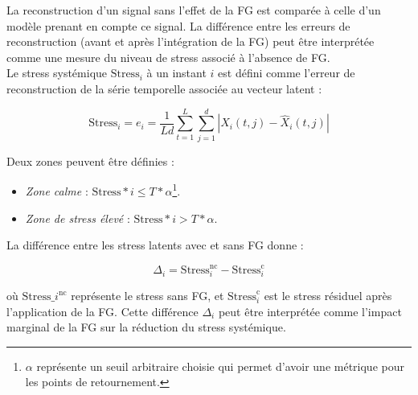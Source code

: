 La reconstruction d’un signal sans l'effet de la FG est comparée à celle d'un modèle prenant en compte ce signal. La différence entre les erreurs de reconstruction (avant et après l’intégration de la FG) peut être interprétée comme une mesure du niveau de stress associé à l'absence de FG.\\

Le stress systémique $\text{Stress}_i$ à un instant $i$ est défini comme l’erreur de reconstruction de la série temporelle associée au vecteur latent :

\begin{equation}
\text{Stress}_i = e_i = \frac{1}{Ld} \sum_{t=1}^L \sum_{j=1}^d |X_i(t,j) - \widehat{X}_i(t,j)|
\end{equation}

Deux zones peuvent être définies :

\begin{itemize}
    \item \textit{Zone calme} : $\text{Stress}*i \leq T*{\alpha}$\footnote{$\alpha$ représente un seuil arbitraire choisie qui permet d'avoir une métrique pour les points de retournement.}.
    \item \textit{Zone de stress élevé} : $\text{Stress}*i > T*{\alpha}$.
\end{itemize}

La différence entre les stress latents avec et sans FG donne :

\begin{equation}
\Delta_i = \text{Stress}_i^{\text{nc}} - \text{Stress}_i^{\text{c}}
\end{equation}

où $\text{Stress}\_i^{\text{nc}}$ représente le stress sans FG, et $\text{Stress}_i^{\text{c}}$ est le stress résiduel après l’application de la FG. Cette différence $\Delta_i$ peut être interprétée comme l’impact marginal de la FG sur la réduction du stress systémique.\\

